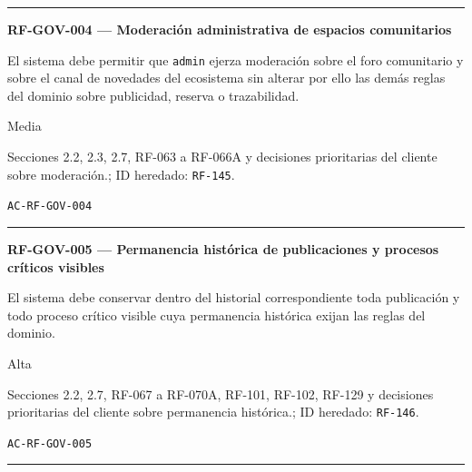 \documentclass[10pt,letterpaper]{article}
\begin{document}
\vspace{0.25em}\hrule\vspace{0.65em}
\noindent\textbf{RF-GOV-004 --- Moderación administrativa de espacios comunitarios}\par
\begin{description}[style=nextline,leftmargin=3.15cm,labelwidth=2.8cm,font=\normalfont\bfseries]
\item[Obligación] El sistema debe permitir que \texttt{admin} ejerza moderación sobre el foro comunitario y sobre el canal de novedades del ecosistema sin alterar por ello las demás reglas del dominio sobre publicidad, reserva o trazabilidad.
\item[Prioridad] Media
\item[Procedencia] Secciones 2.2, 2.3, 2.7, RF-063 a RF-066A y decisiones prioritarias del cliente sobre moderación.; ID heredado: \texttt{RF-145}.
\item[Verificación] \texttt{AC-RF-GOV-004}
\end{description}
\vspace{0.25em}\hrule\vspace{0.65em}
\noindent\textbf{RF-GOV-005 --- Permanencia histórica de publicaciones y procesos críticos visibles}\par
\begin{description}[style=nextline,leftmargin=3.15cm,labelwidth=2.8cm,font=\normalfont\bfseries]
\item[Obligación] El sistema debe conservar dentro del historial correspondiente toda publicación y todo proceso crítico visible cuya permanencia histórica exijan las reglas del dominio.
\item[Prioridad] Alta
\item[Procedencia] Secciones 2.2, 2.7, RF-067 a RF-070A, RF-101, RF-102, RF-129 y decisiones prioritarias del cliente sobre permanencia histórica.; ID heredado: \texttt{RF-146}.
\item[Verificación] \texttt{AC-RF-GOV-005}
\end{description}
\vspace{0.25em}\hrule\vspace{0.65em}
\end{document}
